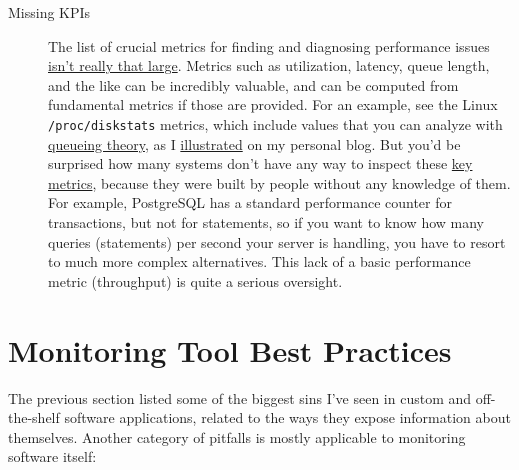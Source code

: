 \documentclass{vivid_layout}
\begin{document}
\begin{description}
\item[Missing KPIs] The list of crucial metrics for finding and diagnosing
performance issues
\href{http://www.xaprb.com/blog/2011/10/06/fundamental-performance-and-scalability-instrumentation/}{isn't
really that large}. Metrics such as utilization, latency, queue length, and the
like can be incredibly valuable, and can be computed from fundamental metrics if
those are provided. For an example, see the Linux \texttt{/proc/diskstats}
metrics, which include values that you can analyze with
\href{https://www.vividcortex.com/resources/queueing-theory/}{queueing theory},
as I
\href{http://www.xaprb.com/blog/2010/01/09/how-linux-iostat-computes-its-results/}{illustrated}
on my personal blog. But you'd be surprised how many systems don't have any way
to inspect these \href{http://www.brendangregg.com/usemethod.html}{key metrics},
because they were built by people without any knowledge of them. For example,
PostgreSQL has a standard performance counter for transactions, but not for
statements, so if you want to know how many queries (statements) per second your
server is handling, you have to resort to much more complex alternatives. This
lack of a basic performance metric (throughput) is quite a serious oversight.

\end{description}

\section{Monitoring Tool Best Practices}

The previous section listed some of the biggest sins I've seen in custom and off-the-shelf
software applications, related to the ways they expose information about
themselves. Another category of pitfalls is mostly applicable to
monitoring software itself:
\end{document}

